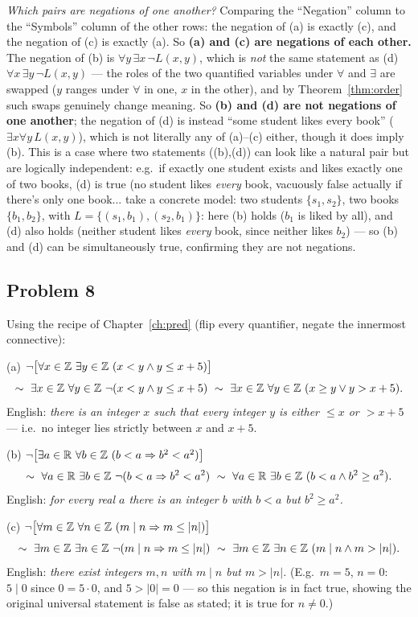 \emph{Which pairs are negations of one another?} Comparing the ``Negation'' column to the ``Symbols'' column of the other rows: the negation of (a) is exactly (c), and the negation of (c) is exactly (a). So \textbf{(a) and (c) are negations of each other.} The negation of (b) is $\forall y\,\exists x\,\neg L(x,y)$, which is \emph{not} the same statement as (d) $\forall x\,\exists y\,\neg L(x,y)$ — the roles of the two quantified variables under $\forall$ and $\exists$ are swapped ($y$ ranges under $\forall$ in one, $x$ in the other), and by Theorem~\ref{thm:order} such swaps genuinely change meaning. So \textbf{(b) and (d) are not negations of one another}; the negation of (d) is instead ``some student likes every book'' ($\exists x\forall y\,L(x,y)$), which is not literally any of (a)--(c) either, though it does imply (b). This is a case where two statements ((b),(d)) can look like a natural pair but are logically independent: e.g.\ if exactly one student exists and likes exactly one of two books, (d) is true (no student likes \emph{every} book, vacuously false actually if there's only one book... take a concrete model: two students $\{s_1,s_2\}$, two books $\{b_1,b_2\}$, with $L=\{(s_1,b_1),(s_2,b_1)\}$: here (b) holds ($b_1$ is liked by all), and (d) also holds (neither student likes \emph{every} book, since neither likes $b_2$) — so (b) and (d) can be simultaneously true, confirming they are not negations.

\subsection*{Problem 8}
Using the recipe of Chapter~\ref{ch:pred} (flip every quantifier, negate the innermost connective):

(a) $\neg\bigl[\forall x\in\mathbb{Z}\ \exists y\in\mathbb{Z}\ (x<y\wedge y\le x+5)\bigr]$
\[
\lequiv\ \exists x\in\Z\ \forall y\in\Z\ \neg(x<y\wedge y\le x+5)\ \lequiv\ \exists x\in\Z\ \forall y\in\Z\ (x\ge y\vee y>x+5).
\]
English: \emph{there is an integer $x$ such that every integer $y$ is either $\le x$ or $>x+5$} — i.e.\ no integer lies strictly between $x$ and $x+5$.

(b) $\neg\bigl[\exists a\in\mathbb{R}\ \forall b\in\mathbb{Z}\ (b<a\Rightarrow b^2<a^2)\bigr]$
\[
\lequiv\ \forall a\in\R\ \exists b\in\Z\ \neg(b<a\Rightarrow b^2<a^2)\ \lequiv\ \forall a\in\R\ \exists b\in\Z\ (b<a\wedge b^2\ge a^2).
\]
English: \emph{for every real $a$ there is an integer $b$ with $b<a$ but $b^2\ge a^2$.}

(c) $\neg\bigl[\forall m\in\mathbb{Z}\ \forall n\in\mathbb{Z}\ (m\mid n\Rightarrow m\le|n|)\bigr]$
\[
\lequiv\ \exists m\in\Z\ \exists n\in\Z\ \neg(m\mid n\Rightarrow m\le|n|)\ \lequiv\ \exists m\in\Z\ \exists n\in\Z\ (m\mid n\wedge m>|n|).
\]
English: \emph{there exist integers $m,n$ with $m\mid n$ but $m>|n|$.} (E.g.\ $m=5$, $n=0$: $5\mid0$ since $0=5\cdot0$, and $5>|0|=0$ — so this negation is in fact true, showing the original universal statement is false as stated; it is true for $n\ne0$.)
